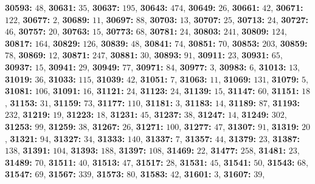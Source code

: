 \textsf{\bfseries 30593:} $48$, \textsf{\bfseries 30631:} $35$, \textsf{\bfseries 30637:} $195$, \textsf{\bfseries 30643:} $474$, \textsf{\bfseries 30649:} $26$, \textsf{\bfseries 30661:} $42$, \textsf{\bfseries 30671:} $122$, \textsf{\bfseries 30677:} $2$, \textsf{\bfseries 30689:} $11$, \textsf{\bfseries 30697:} $88$, \textsf{\bfseries 30703:} $13$, \textsf{\bfseries 30707:} $25$, \textsf{\bfseries 30713:} $24$, \textsf{\bfseries 30727:} $46$, \textsf{\bfseries 30757:} $20$, \textsf{\bfseries 30763:} $15$, \textsf{\bfseries 30773:} $68$, \textsf{\bfseries 30781:} $24$, \textsf{\bfseries 30803:} $241$, \textsf{\bfseries 30809:} $124$, \textsf{\bfseries 30817:} $164$, \textsf{\bfseries 30829:} $126$, \textsf{\bfseries 30839:} $48$, \textsf{\bfseries 30841:} $74$, \textsf{\bfseries 30851:} $70$, \textsf{\bfseries 30853:} $203$, \textsf{\bfseries 30859:} $78$, \textsf{\bfseries 30869:} $12$, \textsf{\bfseries 30871:} $247$, \textsf{\bfseries 30881:} $30$, \textsf{\bfseries 30893:} $91$, \textsf{\bfseries 30911:} $23$, \textsf{\bfseries 30931:} $65$, \textsf{\bfseries 30937:} $15$, \textsf{\bfseries 30941:} $29$, \textsf{\bfseries 30949:} $77$, \textsf{\bfseries 30971:} $84$, \textsf{\bfseries 30977:} $3$, \textsf{\bfseries 30983:} $6$, \textsf{\bfseries 31013:} $13$, \textsf{\bfseries 31019:} $36$, \textsf{\bfseries 31033:} $115$, \textsf{\bfseries 31039:} $42$, \textsf{\bfseries 31051:} $7$, \textsf{\bfseries 31063:} $11$, \textsf{\bfseries 31069:} $131$, \textsf{\bfseries 31079:} $5$, \textsf{\bfseries 31081:} $106$, \textsf{\bfseries 31091:} $16$, \textsf{\bfseries 31121:} $24$, \textsf{\bfseries 31123:} $24$, \textsf{\bfseries 31139:} $15$, \textsf{\bfseries 31147:} $60$, \textsf{\bfseries 31151:} $18$, \textsf{\bfseries 31153:} $31$, \textsf{\bfseries 31159:} $73$, \textsf{\bfseries 31177:} $110$, \textsf{\bfseries 31181:} $3$, \textsf{\bfseries 31183:} $14$, \textsf{\bfseries 31189:} $87$, \textsf{\bfseries 31193:} $232$, \textsf{\bfseries 31219:} $19$, \textsf{\bfseries 31223:} $18$, \textsf{\bfseries 31231:} $45$, \textsf{\bfseries 31237:} $38$, \textsf{\bfseries 31247:} $14$, \textsf{\bfseries 31249:} $302$, \textsf{\bfseries 31253:} $99$, \textsf{\bfseries 31259:} $38$, \textsf{\bfseries 31267:} $26$, \textsf{\bfseries 31271:} $100$, \textsf{\bfseries 31277:} $47$, \textsf{\bfseries 31307:} $91$, \textsf{\bfseries 31319:} $20$, \textsf{\bfseries 31321:} $94$, \textsf{\bfseries 31327:} $34$, \textsf{\bfseries 31333:} $140$, \textsf{\bfseries 31337:} $7$, \textsf{\bfseries 31357:} $44$, \textsf{\bfseries 31379:} $23$, \textsf{\bfseries 31387:} $138$, \textsf{\bfseries 31391:} $104$, \textsf{\bfseries 31393:} $188$, \textsf{\bfseries 31397:} $108$, \textsf{\bfseries 31469:} $22$, \textsf{\bfseries 31477:} $258$, \textsf{\bfseries 31481:} $23$, \textsf{\bfseries 31489:} $70$, \textsf{\bfseries 31511:} $40$, \textsf{\bfseries 31513:} $47$, \textsf{\bfseries 31517:} $28$, \textsf{\bfseries 31531:} $45$, \textsf{\bfseries 31541:} $50$, \textsf{\bfseries 31543:} $68$, \textsf{\bfseries 31547:} $69$, \textsf{\bfseries 31567:} $339$, \textsf{\bfseries 31573:} $80$, \textsf{\bfseries 31583:} $42$, \textsf{\bfseries 31601:} $3$, \textsf{\bfseries 31607:} $39$, 

